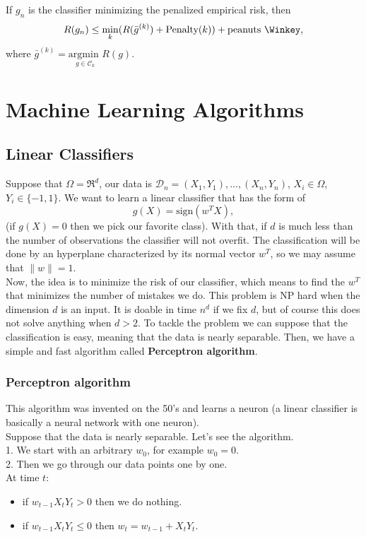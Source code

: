 \documentclass[11pt, english]{article}
\begin{document}
If $g_n$ is the classifier minimizing the penalized empirical risk, then
\begin{equation}
	R(g_n)\leq \underset{k}{\min}(R(\bar{g}^{(k)})+\text{Penalty}(k))+\text{peanuts \Winkey},
\end{equation} 
where $\bar{g}^{(k)}=\underset{g\in\mathcal{C}_k}{\text{argmin }}R(g)$.

\section{Machine Learning Algorithms}

\subsection{Linear Classifiers} 

Suppose that $\Omega= \Re^d$, our data is $\mathcal{D}_n=(X_1,Y_1),\dots,(X_n,Y_n)$, $X_i\in \Omega$, $Y_i\in\{-1,1\}$. We want to learn a linear classifier that has the form of 
\begin{equation}
	g(X)=\text{sign}(w^TX),
\end{equation}
(if $g(X)=0$ then we pick our favorite class). With that, if $d$ is much less than the number of observations the classifier will not overfit. The classification will be done by an hyperplane characterized by its normal vector $w^T$, so we may assume that $\|w\|=1$.\\

Now, the idea is to minimize the risk of our classifier, which means to find the $w^T$ that minimizes the number of mistakes we do. This problem is NP hard when the dimension $d$ is an input. It is doable in time $n^d$ if we fix $d$, but of course this does not solve anything when $d>2$. To tackle the problem we can suppose that the classification is easy, meaning that the data is nearly separable. Then, we have a simple and fast algorithm called \textbf{Perceptron algorithm}.

\subsubsection{Perceptron algorithm}
This algorithm was invented on the 50's and learns a neuron (a linear classifier is basically a neural network with one neuron). \\
Suppose that the data is nearly separable. Let's see the algorithm.\\

1. We start with an arbitrary $w_0$, for example $w_0=0$.\\
2. Then we go through our data points one by one.\\
At time $t$:
\begin{itemize}
	\item[]  if $w_{t-1}X_tY_t> 0$ then we do nothing.
	\item[]  if $w_{t-1}X_tY_t\leq 0$ then $w_t=w_{t-1}+X_tY_t$.
\end{itemize}
\end{document}
